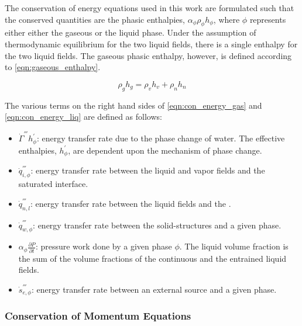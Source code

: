 The conservation of energy equations used in this work are formulated such that the conserved quantities are the phasic enthalpies, $\alpha_{\phi} \rho_{\phi} h_{\phi}$, where $\phi$ represents either either the gaseous or the liquid phase.
Under the assumption of thermodynamic equilibrium for the two liquid fields, there is a single enthalpy for the two liquid fields.
The gaseous phasic enthalpy, however, is defined according to \eqref{eqn:gaseous_enthalpy}.

\begin{equation}
\label{eqn:gaseous_enthalpy}
\rho_g h_g = \rho_v h_v + \rho_n h_n
\end{equation}

The various terms on the right hand sides of \eqref{eqn:con_energy_gas} and \eqref{eqn:con_energy_liq} are defined as follows:

\begin{itemize}
\item{
$\dot{\Gamma}^{'''} h^{'}_{\phi}$:
 energy transfer rate due to the phase change of water.
 The effective enthalpies, $h^{'}_{\phi}$, are dependent upon the mechanism of phase change.
}
\item{
$\dot{q}^{'''}_{i,\phi}$:
energy transfer rate between the liquid and vapor fields and the saturated interface.
}
\item{
$\dot{q}^{'''}_{n,l}$:
energy transfer rate between the liquid fields and the \ncgs{}.
}
\item{
$\dot{q}^{'''}_{w,\phi}$:
 energy transfer rate between the solid-structures and a given phase.
}
\item{
$\alpha_{\phi} \frac{\partial P}{\partial t}$:
 pressure work done by a given phase $\phi$.
 The liquid volume fraction is the sum of the volume fractions of the continuous and the entrained liquid fields.
}
\item{
$\dot{s}^{'''}_{e,\phi}$:
 energy transfer rate between an external source and a given phase.
}
\end{itemize}

\subsubsection{Conservation of Momentum Equations}
\label{subsubsect:momentum_equations}

